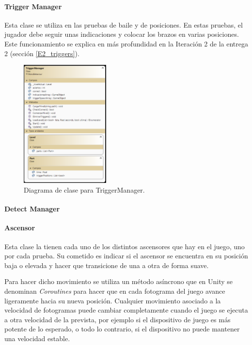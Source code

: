\paragraph{Trigger Manager}
Esta clase se utiliza en las pruebas de baile y de posiciones. En estas pruebas, el jugador debe seguir unas indicaciones y colocar los brazos en varias posiciones. Este funcionamiento se explica en más profundidad en la Iteración 2 de la entrega 2 (sección \ref{E2_triggers}).

\begin{figure}
	\centering
	\includegraphics[width=0.4\textwidth]{04.Desarrollo/05.Entrega5/01.Iteracion5_1/00.Figuras/16.diagrama_trigger_manager.png}
	\caption{Diagrama de clase para TriggerManager.}
	\label{fig:diagramaTriggerManager}
\end{figure}


\paragraph{Detect Manager}





\paragraph{Ascensor}
Esta clase la tienen cada uno de los distintos ascensores que hay en el juego, uno por cada prueba. Su cometido es indicar si el ascensor se encuentra en su posición baja o elevada y hacer que transicione de una a otra de forma suave. 

Para hacer dicho movimiento se utiliza un método asíncrono que en Unity se denominan \textit{Coroutines} para hacer que en cada fotograma del juego avance ligeramente hacia su nueva posición. Cualquier movimiento asociado a la velocidad de fotogramas puede cambiar completamente cuando el juego se ejecuta a otra velocidad de la prevista, por ejemplo si el dispositivo de juego es más potente de lo esperado, o todo lo contrario, si el dispositivo no puede mantener una velocidad estable. 

